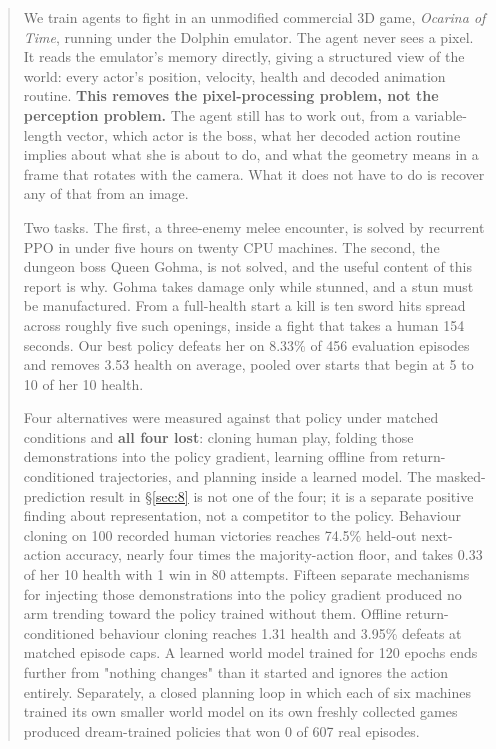 \documentclass[11pt]{article}
\begin{document}
\begin{abstract}\noindent

We train agents to fight in an unmodified commercial 3D game, \emph{Ocarina of Time}, running under the Dolphin emulator. The agent never sees a pixel. It reads the emulator's memory directly, giving a structured view of the world: every actor's position, velocity, health and decoded animation routine. \textbf{This removes the pixel-processing problem, not the perception problem.} The agent still has to work out, from a variable-length vector, which actor is the boss, what her decoded action routine implies about what she is about to do, and what the geometry means in a frame that rotates with the camera. What it does not have to do is recover any of that from an image.

Two tasks. The first, a three-enemy melee encounter, is solved by recurrent PPO in under five hours on twenty CPU machines. The second, the dungeon boss Queen Gohma, is not solved, and the useful content of this report is why. Gohma takes damage only while stunned, and a stun must be manufactured. From a full-health start a kill is ten sword hits spread across roughly five such openings, inside a fight that takes a human 154 seconds. Our best policy defeats her on 8.33\% of 456 evaluation episodes and removes 3.53 health on average, pooled over starts that begin at 5 to 10 of her 10 health.

Four alternatives were measured against that policy under matched conditions and \textbf{all four lost}: cloning human play, folding those demonstrations into the policy gradient, learning offline from return-conditioned trajectories, and planning inside a learned model. The masked-prediction result in \S\ref{sec:8} is not one of the four; it is a separate positive finding about representation, not a competitor to the policy. Behaviour cloning on 100 recorded human victories reaches 74.5\% held-out next-action accuracy, nearly four times the majority-action floor, and takes 0.33 of her 10 health with 1 win in 80 attempts. Fifteen separate mechanisms for injecting those demonstrations into the policy gradient produced no arm trending toward the policy trained without them. Offline return-conditioned behaviour cloning reaches 1.31 health and 3.95\% defeats at matched episode caps. A learned world model trained for 120 epochs ends further from "nothing changes" than it started and ignores the action entirely. Separately, a closed planning loop in which each of six machines trained its own smaller world model on its own freshly collected games produced dream-trained policies that won 0 of 607 real episodes.


\end{abstract}
\end{document}
